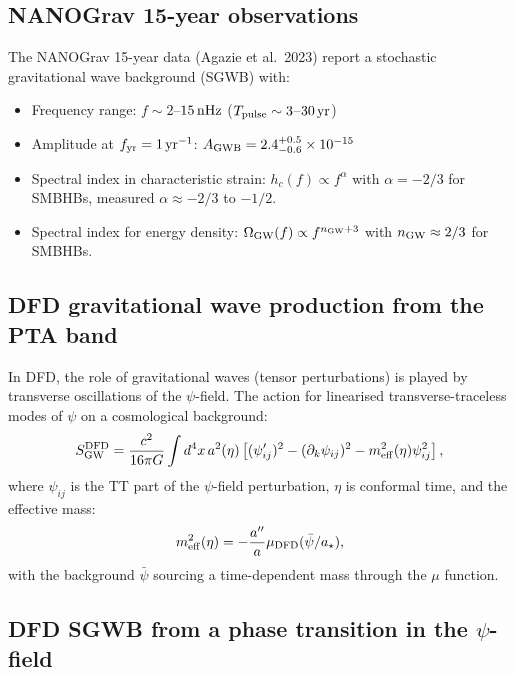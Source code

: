 \documentclass[11pt]{article}
\newcommand{\ee}[1]{\times 10^{#1}}
\newcommand{\mufd}{\mu}
\newcommand{\DFD}{{\rm DFD}}
\begin{document}
\subsection{NANOGrav 15-year observations}

The NANOGrav 15-year data (Agazie et al.\ 2023) report a stochastic
gravitational wave background (SGWB) with:
\begin{itemize}[nosep]
  \item Frequency range: $f \sim 2$--$15\,{\rm nHz}$
    ($T_{\rm pulse} \sim 3$--$30\,{\rm yr}$)
  \item Amplitude at $f_{\rm yr} = 1\,{\rm yr}^{-1}$:
    $A_{\rm GWB} = 2.4^{+0.5}_{-0.6}\ee{-15}$
  \item Spectral index in characteristic strain:
    $h_c(f) \propto f^{\alpha}$ with $\alpha = -2/3$ for SMBHBs,
    measured $\alpha \approx -2/3$ to $-1/2$.
  \item Spectral index for energy density:
    $\Omega_{\rm GW}(f) \propto f^{n_{\rm GW} + 3}$ with
    $n_{\rm GW} \approx 2/3$ for SMBHBs.
\end{itemize}

\subsection{DFD gravitational wave production from the PTA band}

In DFD, the role of gravitational waves (tensor perturbations) is played
by transverse oscillations of the $\psi$-field.  The action for
linearised transverse-traceless modes of $\psi$ on a cosmological
background:
\begin{equation}\label{eq:tensor-action}
  S_{\rm GW}^\DFD = \frac{c^2}{16\pi G}\int d^4x\,a^2(\eta)
  \left[(\psi_{ij}')^2 - (\partial_k\psi_{ij})^2
  - m_{\rm eff}^2(\eta)\psi_{ij}^2\right],
\end{equation}
where $\psi_{ij}$ is the TT part of the $\psi$-field perturbation,
$\eta$ is conformal time, and the effective mass:
\begin{equation}
  m_{\rm eff}^2(\eta) = -\frac{a''}{a}\mu_\DFD(\bar\psi/a_\star),
\end{equation}
with the background $\bar\psi$ sourcing a time-dependent mass through
the $\mufd$ function.

\subsection{DFD SGWB from a phase transition in the $\psi$-field}
\end{document}
